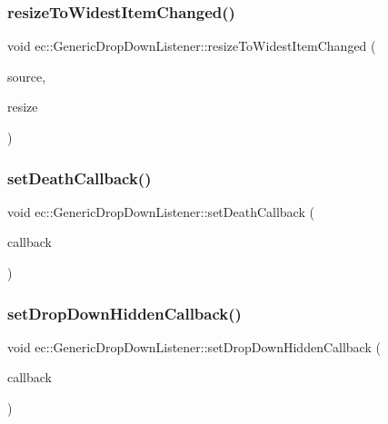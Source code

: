 \subsubsection{\texorpdfstring{resize\+To\+Widest\+Item\+Changed()}{resizeToWidestItemChanged()}}
{\footnotesize\ttfamily void ec\+::\+Generic\+Drop\+Down\+Listener\+::resize\+To\+Widest\+Item\+Changed (\begin{DoxyParamCaption}\item[{agui\+::\+Drop\+Down $\ast$}]{source,  }\item[{bool}]{resize }\end{DoxyParamCaption})\hspace{0.3cm}{\ttfamily [override]}}

\mbox{\label{classec_1_1_generic_drop_down_listener_a6fac243931f048ee2cc55ec1ffa5ccf4}} 
\subsubsection{\texorpdfstring{set\+Death\+Callback()}{setDeathCallback()}}
{\footnotesize\ttfamily void ec\+::\+Generic\+Drop\+Down\+Listener\+::set\+Death\+Callback (\begin{DoxyParamCaption}\item[{const \mbox{\hyperlink{classec_1_1_generic_drop_down_listener_a72a84eeb2fdcc0eae78b78c53a59db3b}{Death\+Callback\+\_\+\+Callback}} \&}]{callback }\end{DoxyParamCaption})}

\mbox{\label{classec_1_1_generic_drop_down_listener_a3960331abcb033fbace69f59e875cadd}} 
\subsubsection{\texorpdfstring{set\+Drop\+Down\+Hidden\+Callback()}{setDropDownHiddenCallback()}}
{\footnotesize\ttfamily void ec\+::\+Generic\+Drop\+Down\+Listener\+::set\+Drop\+Down\+Hidden\+Callback (\begin{DoxyParamCaption}\item[{const \mbox{\hyperlink{classec_1_1_generic_drop_down_listener_ae0548e780805b39f5817e6659932b478}{Drop\+Down\+Hidden\+\_\+\+Callback}} \&}]{callback }\end{DoxyParamCaption})}

